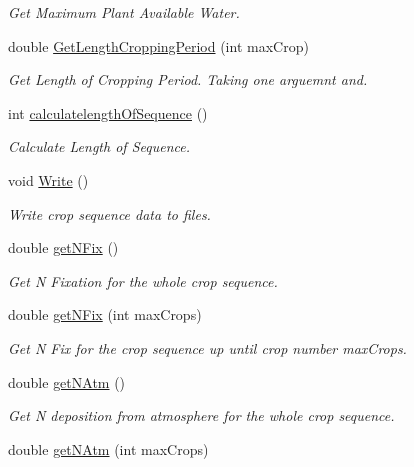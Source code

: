\begin{DoxyCompactItemize}
\begin{DoxyCompactList}\small\item\em Get Maximum Plant Available Water. \end{DoxyCompactList}\item 
double \mbox{\hyperlink{class_crop_sequence_class_a53a1fba19a3f7194449b74c643927437}{Get\+Length\+Cropping\+Period}} (int max\+Crop)
\begin{DoxyCompactList}\small\item\em Get Length of Cropping Period. Taking one arguemnt and. \end{DoxyCompactList}\item 
int \mbox{\hyperlink{class_crop_sequence_class_a8ea5e635a7e942c936d23f7e9e9ba840}{calculatelength\+Of\+Sequence}} ()
\begin{DoxyCompactList}\small\item\em Calculate Length of Sequence. \end{DoxyCompactList}\item 
void \mbox{\hyperlink{class_crop_sequence_class_aba8e1ea5cc4812106e2b2fbeb0d9b157}{Write}} ()
\begin{DoxyCompactList}\small\item\em Write crop sequence data to files. \end{DoxyCompactList}\item 
double \mbox{\hyperlink{class_crop_sequence_class_a6a457da282f25f876f72361627966d8b}{get\+N\+Fix}} ()
\begin{DoxyCompactList}\small\item\em Get N Fixation for the whole crop sequence. \end{DoxyCompactList}\item 
double \mbox{\hyperlink{class_crop_sequence_class_af712de3da9cee75cd72099d132d9ce4f}{get\+N\+Fix}} (int max\+Crops)
\begin{DoxyCompactList}\small\item\em Get N Fix for the crop sequence up until crop number max\+Crops. \end{DoxyCompactList}\item 
double \mbox{\hyperlink{class_crop_sequence_class_ae39925ea474556830b1d10d17ba8637a}{get\+N\+Atm}} ()
\begin{DoxyCompactList}\small\item\em Get N deposition from atmosphere for the whole crop sequence. \end{DoxyCompactList}\item 
double \mbox{\hyperlink{class_crop_sequence_class_ae6da92b63f5527310b369acc051f001a}{get\+N\+Atm}} (int max\+Crops)

\end{DoxyCompactItemize}
